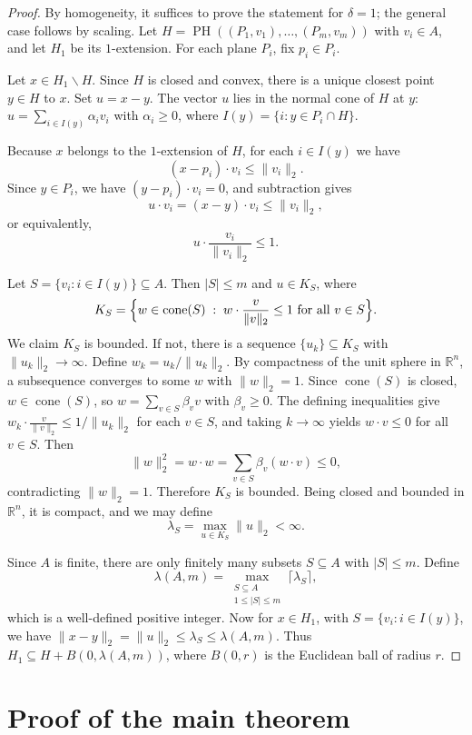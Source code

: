 \documentclass[10pt,a4paper]{amsart}
\newcommand{\R}{\mathbb R}
\newcommand{\norm}[1]{\lVert#1\rVert}
\DeclareMathOperator{\cone}{cone}
\begin{document}
\begin{proof}
By homogeneity, it suffices to prove the statement for $\delta=1$; the
general case follows by scaling. Let
$H=\operatorname{PH}((P_1,v_1),\dots,(P_m,v_m))$ with $v_i\in A$, and
let $H_1$ be its $1$-extension. For each plane $P_i$, fix $p_i\in P_i$.

Let $x\in H_1\backslash H$. Since $H$ is closed and convex, there is a unique closest
point $y\in H$ to $x$. Set $u=x-y$. The vector
$u$ lies in the normal cone of $H$ at $y$:
$u=\sum_{i\in I(y)}\alpha_i v_i$ with $\alpha_i\geq 0$, where
$I(y)=\{i\colon y\in P_i\cap H\}$.

Because $x$ belongs to the $1$-extension of $H$, for each $i\in I(y)$
we have
\[
(x-p_i)\cdot v_i\leq \|v_i\|_2.
\]
Since $y\in P_i$, we have $(y-p_i)\cdot v_i=0$, and subtraction gives
\[
u\cdot v_i = (x-y)\cdot v_i \le \norm{v_i}_2,
\]
or equivalently,
\[
u\cdot \frac{v_i}{\norm{v_i}_2} \le 1.
\]

Let $S=\{v_i\colon i\in I(y)\}\subseteq A$. Then $|S|\leq m$ and
$u\in K_S$, where
\[
K_S=\Bigl\{w\in\cone(S)\;:\;
w\cdot\frac{v}{\|v\|_2}\leq 1\text{ for all }v\in S\Bigr\}.
\]
We claim $K_S$ is bounded. If not, there is a sequence
$\{u_k\}\subseteq K_S$ with $\|u_k\|_2\to\infty$. Define
$w_k=u_k/\|u_k\|_2$. By compactness of the unit sphere in $\mathbb{R}^n$,
a subsequence converges to some $w$ with $\|w\|_2=1$. Since $\cone(S)$
is closed, $w\in\cone(S)$, so $w=\sum_{v\in S}\beta_v v$ with
$\beta_v\geq 0$. The defining inequalities give
$w_k\cdot\frac{v}{\|v\|_2}\leq 1/\|u_k\|_2$ for each $v\in S$, and
taking $k\to\infty$ yields $w\cdot v\leq 0$ for all $v\in S$. Then
\[
\|w\|_2^2=w\cdot w=\sum_{v\in S}\beta_v(w\cdot v)\leq 0,
\]
contradicting $\|w\|_2=1$. Therefore $K_S$ is bounded. Being closed and bounded in $\R^n$, it is compact, and we may define $$\lambda_S = \max_{u\in K_S}\norm{u}_2 < \infty.$$

Since $A$ is finite, there are only finitely many subsets
$S\subseteq A$ with $|S|\leq m$. Define
\[
\lambda(A,m)=\max_{\substack{S\subseteq A\\ 1\leq |S|\leq m}}
\lceil\lambda_S\rceil,
\]
which is a well-defined positive integer. Now for $x\in H_1$, with
$S=\{v_i\colon i\in I(y)\}$, we have
$\|x-y\|_2=\|u\|_2\leq\lambda_S\leq\lambda(A,m)$. Thus
$H_1\subseteq H+B(0,\lambda(A,m))$, where $B(0,r)$ is the Euclidean
ball of radius $r$.
\end{proof}

\section{Proof of the main theorem}\label{sec:proof}
\end{document}

